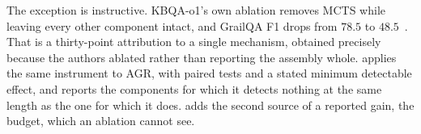 The exception is instructive. KBQA-o1's own ablation removes MCTS while
leaving every other component intact, and GrailQA F1 drops from $78.5$
to $48.5$~\cite{luo2025kbqao1}. That is a thirty-point attribution to a
single mechanism, obtained precisely because the authors ablated rather
than reporting the assembly whole.  applies the
same instrument to AGR, with paired tests and a stated minimum
detectable effect, and reports the components for which it detects
nothing at the same length as the one for which it does.
 adds the second source of a reported gain, the budget,
which an ablation cannot see.
